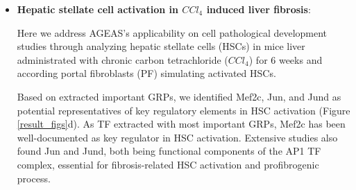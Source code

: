\documentclass[fleqn,10pt]{wlscirep}
\begin{document}
\begin{itemize}


      \item {\textbf{Hepatic stellate cell activation in $CCl_4$ induced liver fibrosis}}:

        Here we address AGEAS's applicability on cell pathological development studies through analyzing hepatic stellate cells (HSCs) in mice liver administrated with chronic carbon tetrachloride ($CCl_4$) for 6 weeks and according portal fibroblasts (PF) simulating activated HSCs.

        Based on extracted important GRPs, we identified Mef2c, Jun, and Jund as potential representatives of key regulatory elements in HSC activation (Figure \ref{result_figs}d).
        As TF extracted with most important GRPs, Mef2c has been well-documented as key regulator in HSC activation. \cite{mef2c_1, mef2c_2, mef2c_3}
        Extensive studies also found Jun and Jund, both being functional components of the AP1 TF complex, essential for fibrosis-related HSC activation and profibrogenic process. \cite{ap1_hsc_1, ap1_hsc_2, ap1_hsc_3, ap1_hsc_4}


\end{itemize}
\end{document}
